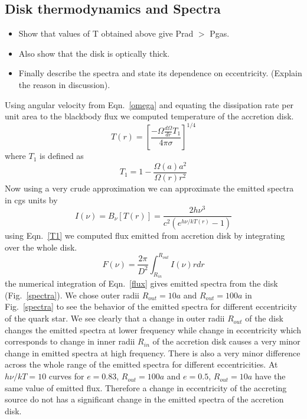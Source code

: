 \documentclass[useAMS,usenatbib]{mn2e}
\begin{document}
\subsection{Disk thermodynamics and Spectra}
\begin{itemize}
\item Show that values of T obtained above give Prad $>$ Pgas. 
\item Also show that the disk is optically thick.
\item Finally describe the spectra and state its dependence on
  eccentricity. (Explain the reason in discussion).
\end{itemize}
Using angular velocity from Eqn.~\ref{omega} and equating the dissipation rate per unit area to the blackbody flux we computed temperature of the accretion disk.
\begin{equation}
T(r) = \left[\frac{-\Omega\frac{d\Omega}{dr}T_1}{4\pi\sigma}\right]^{1/4}
\end{equation}
where $T_1$ is defined as
\begin{equation}
T_1 = 1 - \frac{\Omega(a)a^2}{\Omega(r)r^2}
\label{T1}
\end{equation}
Now using a very crude approximation we can approximate the emitted spectra in cgs units by
\begin{equation}
I(\nu) = B_{\nu}[T(r)] = \frac{2h\nu^3}{c^2(e^{h\nu/kT(r)} -1)}
\end{equation}
using Eqn.~\ref{T1} we computed flux emitted from accretion disk by integrating over the whole disk.
\begin{equation}
F(\nu) = \frac{2\pi}{D^2}\int^{R_{out}}_{R_{in}}I(\nu)rdr
\label{flux}
\end{equation}
the numerical integration of Eqn.~\ref{flux} gives emitted spectra from the disk (Fig.~\ref{spectra}). We chose outer radii $R_{out} = 10a$ and $R_{out} = 100a$ in Fig.~\ref{spectra} to see the behavior of the emitted spectra for different eccentricity of the quark star. We see clearly that a change in outer radii $R_{out}$ of the disk changes the emitted spectra at lower frequency while change in eccentricity which corresponds to change in inner radii $R_{in}$ of the accretion disk causes a very minor change in emitted spectra at high frequency. There is also a very minor difference across the whole range of the emitted spectra for different eccentricities. At $h\nu/kT = 10$ curves for $e = 0.83$, $R_{out} = 100a$ and $e = 0.5$, $R_{out} = 10a$ have the same value of emitted flux. Therefore a change in eccentricity of the accreting source do not has a significant change in the emitted spectra of the accretion disk.
\end{document}
